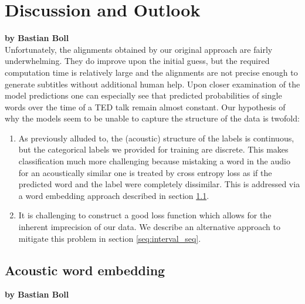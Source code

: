 \chapter{Discussion and Outlook}

\textbf{by Bastian Boll} \\

Unfortunately, the alignments obtained by our original approach are fairly underwhelming. They do improve upon the initial guess, but the required computation time is relatively large and the alignments are not precise enough to generate subtitles without additional human help. Upon closer examination of the model predictions one can especially see that predicted probabilities of single words over the time of a TED talk remain almost constant. Our hypothesis of why the models seem to be unable to capture the structure of the data is twofold:
\begin{enumerate}
	\item As previously alluded to, the (acoustic) structure of the labels is continuous, but the categorical labels we provided for training are discrete. This makes classification much more challenging because mistaking a word in the audio for an acoustically similar one is treated by cross entropy loss as if the predicted word and the label were completely dissimilar. This is addressed via a word embedding approach described in section \ref{seq:word_embedding}.
	\item It is challenging to construct a good loss function which allows for the inherent imprecision of our data. We describe an alternative approach to mitigate this problem in section \ref{seq:interval_seq}.
\end{enumerate}


\section{Acoustic word embedding}
\label{seq:word_embedding}

\textbf{by Bastian Boll} \\

